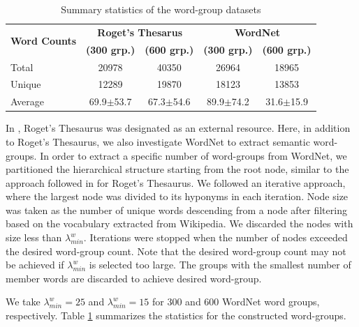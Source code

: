 \documentclass[11pt,a4paper]{article}
\begin{document}
\begin{table}
    \centering
	\begin{tabular}{lcccc}
	    \hline \hline
         \multirow{2}{*}{\textbf{Word Counts}} & \multicolumn{2}{c}{\textbf{Roget's Thesarus}}  & \multicolumn{2}{c}{\textbf{WordNet}} \\
         & \textbf{(300 grp.)} & \textbf{(600 grp.)} & \textbf{(300 grp.)} & \textbf{(600 grp.)} \\ \hline \hline %
         Total & 20978 & 40350 & 26964 & 18965 \\ 
         Unique & 12289 & 19870 & 18123 & 13853 \\
         Average & 69.9$\pm$53.7 & 67.3$\pm$54.6 & 89.9$\pm$74.2 & 31.6$\pm$15.9 \\ \hline \hline %
	\end{tabular}
	\caption{Summary statistics of the word-group datasets}
	\label{tab:roget_vs_wordnet}
\end{table}

In \citet{senel20impart}, Roget's Thesaurus \citep{Roget2008thesaurus} was designated as an external resource.
Here, in addition to Roget's Thesaurus, we also investigate  WordNet \citep{miller95wordnet} to extract semantic word-groups.
In order to extract a specific number of word-groups from WordNet, we partitioned the hierarchical structure starting from the root node, similar to the approach followed in \citet{senel20impart} for Roget's Thesaurus. We followed an iterative approach, where the largest node was divided to its hyponyms in each iteration. Node size was taken as the number of unique words descending from a node after filtering based on the vocabulary extracted from Wikipedia. We discarded the nodes with size less than $\lambda_{min}^w$. Iterations were stopped when the number of nodes exceeded the desired word-group count. Note that the desired word-group count may not be achieved if $\lambda_{min}^w$ is selected too large.
The groups with the smallest number of member words are discarded to achieve desired word-group.

We take $\lambda_{min}^w = 25$ and $\lambda_{min}^w = 15$ for 300 and 600 WordNet word groups, respectively.
Table \ref{tab:roget_vs_wordnet} summarizes the statistics for the constructed word-groups. 

\end{document}
